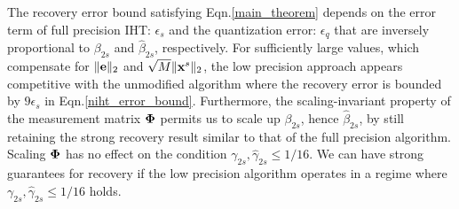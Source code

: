 \documentclass{article}
\begin{document}
 The recovery error bound satisfying Eqn.\ref{main_theorem} depends on the error term of full precision IHT: $ {\epsilon_s}$ and the quantization error: $ {\epsilon}_q$ that are inversely proportional to ${\beta}_{2s}$ and $\hat{\beta}_{2s}$, respectively. For sufficiently large values, which compensate for $\|{\bf e}\|_2$ and $\sqrt{M} \|{\bf x}^s \|_2$, the low precision approach appears competitive with the unmodified algorithm where the recovery error is bounded by $9\epsilon_s$ in Eqn.\ref{niht_error_bound}. Furthermore, the scaling-invariant property of the measurement matrix ${\bf \Phi}$ permits us to scale up ${\beta}_{2s}$, hence $\hat{\beta}_{2s}$, by still retaining the strong recovery result similar to that of the full precision algorithm. Scaling ${\bf \Phi}$ has no effect on the condition ${\gamma}_{2s}, \hat{\gamma}_{2s}\leq 1/16$. We can have strong guarantees for recovery if the low precision algorithm operates in a regime where ${\gamma}_{2s}, \hat{\gamma}_{2s}\leq 1/16$ holds.

\end{document}
